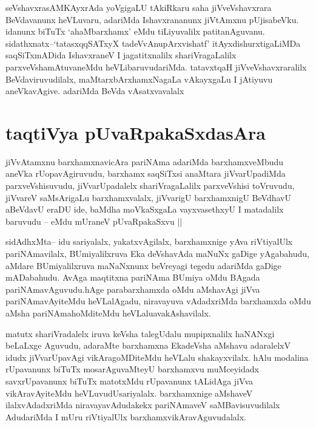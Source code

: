 \begin{artha}
seVshavxrasAMKAyxrAda yoVgigaLU tAkiRkaru saha jiVveVshavxrara
BeVdavanunx heVLuvaru, adariMda Ishavxrananunx jiVtAmxnu
pUjisabeVku. idanunx biTuTx `ahaMbarxhamx' eMdu tiLiyuvalilx
patitanAguvanu. sidathxnatx--`tatasxqqSATxyX tadeVvAnupArxvishatf'
itAyxdishurxtigaLiMDa saqSiTxmADida IshavxraneV I jagatitxnalilx
shariVragaLalilx parxveVshamAtuvaneMdu heVLibaruvudariMda. tatavxtqaH
jiVveVshavxraralilx BeVdaviruvudilalx, maMtarxbArxhamxNagaLa
vAkayxgaLu I jAtiyuvu aneVkavAgive. adariMda BeVda vAsatxvavalalx 
\end{artha}


\section*{taqtiVya pUvaRpakaSxdasAra}


\begin{artha}
jiVvAtamxnu barxhamxnavicAra pariNAma adariMda barxhamxveMbudu aneVka
rUopavAgiruvudu, barxhamx saqSiTxsi anaMtara jiVvarUpadiMda
parxveVshisuvudu, jiVvarUpadalelx shariVragaLalilx parxveVshisi
toVruvudu, jiVvareV  saMsArigaLu barxhamxvalalx, jiVvarigU
barxhamxnigU BeVdhavU aBeVdavU eraDU ide, baMdha moVkaSxgaLa
vayxvasethxyU I matadalilx baruvudu -- eMdu mUraneV pUvaRpakaSxvu ||
\end{artha}


\begin{artha}
sidAdhxMta-- idu sariyalalx, yakatxvAgilalx, barxhamxnige yAva
riVtiyalUlx pariNAmavilalx, BUmiyalilxruva Eka deVshavAda maNuNx
gaDige yAgabahudu, aMdare BUmiyalilxruva maNaNxnunx beVreyagi tegedu
adariMda gaDige mADabahudu. AvAga maqtitxna pariNAma BUmiya oMdu
BAgada pariNAmavAguvudu.hAge parabarxhamxda oMdu aMshavAgi jiVva
pariNAmavAyiteMdu heVLalAgadu, niravayuva vAdadxriMda barxhamxda oMdu
aMsha pariNAmahoMditeMdu heVLaluavakAshavilalx.
\end{artha}

\begin{artha}
matutx shariVradalelx iruva keVsha talegUdalu mupipxnalilx haNANxgi
beLaLxge Aguvudu, adaraMte  barxhamxna EkadeVsha aMshavu adaralelxV
idudx jiVvarUpavAgi vikAragoMDiteMdu heVLalu shakayxvilalx. hAlu
modalina rUpavanunx biTuTx mosarAguvaMteyU barxhamxvu muMceyidadx
savxrUpavanunx biTuTx matotxMdu rUpavanunx tALidAga jiVva
vikAravAyiteMdu heVLuvudUsariyalalx. barxhamxnige aMshaveV
ilalxvAdadxriMda niravayavAdudakekx pariNAmaveV saMBavisuvudilalx
AdudariMda I mUru riVtiyalUlx barxhamxvikAravAguvudalalx.
\end{artha}


